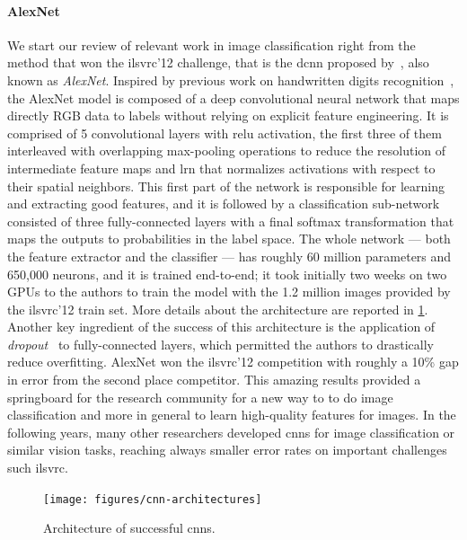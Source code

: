 \paragraph{AlexNet}
We start our review of relevant work in image classification right from the method that won the \gls{ilsvrc}'12 challenge, that is the \gls{dcnn} proposed by~\citet{krizhevsky2012imagenet}, also known as \emph{AlexNet}.
Inspired by previous work on handwritten digits recognition~\cite{lecun1989backpropagation}, the AlexNet model is composed of a deep convolutional neural network that maps directly RGB data to labels without relying on explicit feature engineering.
It is comprised of 5 convolutional layers with \gls{relu} activation, the first three of them interleaved with overlapping max-pooling operations to reduce the resolution of intermediate feature maps and \gls{lrn} that normalizes activations with respect to their spatial neighbors.
This first part of the network is responsible for learning and extracting good features, and it is followed by a classification sub-network consisted of three fully-connected layers with a final softmax transformation that maps the outputs to probabilities in the label space.
The whole network --- both the feature extractor and the classifier --- has roughly 60 million parameters and 650,000 neurons, and it is trained end-to-end;
it took initially two weeks on two GPUs to the authors to train the model with the 1.2 million images provided by the \gls{ilsvrc}'12 train set.
More details about the architecture are reported in \ref{fig:back:cnn-architectures}.
Another key ingredient of the success of this architecture is the application of \emph{dropout}~\cite{hinton2012improving} to fully-connected layers, which permitted the authors to drastically reduce overfitting.
AlexNet won the \gls{ilsvrc}'12 competition with roughly a 10\% gap in error from the second place competitor.
This amazing results provided a springboard for the research community for a new way to to do image classification and more in general to learn high-quality features for images.
In the following years, many other researchers developed \glspl{cnn} for image classification or similar vision tasks, reaching always smaller error rates on important challenges such \gls{ilsvrc}.

\begin{figure}
    \centering
    \texttt{[image: figures/cnn-architectures]}
    \caption{Architecture of successful \glspl{cnn}.}
    \label{fig:back:cnn-architectures}
\end{figure}

